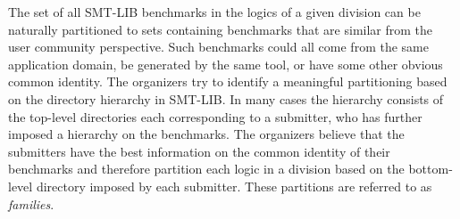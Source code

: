 \documentclass[12pt]{article}
\begin{document}
%
The set of all SMT-LIB benchmarks in the logics of a given division can be
naturally partitioned to sets containing benchmarks that are similar from the
user community perspective.
%
Such benchmarks could all come from the same
application domain, be generated by the same tool, or have some other
obvious common identity.
%
The organizers try to identify a meaningful partitioning based on the
directory hierarchy in SMT-LIB.  In many cases the hierarchy consists of
the top-level directories each corresponding to a submitter, who has
further imposed a hierarchy on the benchmarks.
%
The organizers believe that the submitters have the best information on the
common identity of their benchmarks and therefore partition each logic in a
division based on the bottom-level directory imposed by each submitter.  These
partitions are referred to as \emph{families}.
\end{document}
